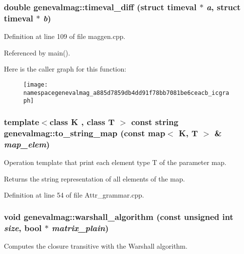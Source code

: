 \hypertarget{namespacegenevalmag_a885d7859db4dd91f78bb7081be6ceacb}{
\subsubsection[{timeval\_\-diff}]{\setlength{\rightskip}{0pt plus 5cm}double genevalmag::timeval\_\-diff (struct timeval $\ast$ {\em a}, \/  struct timeval $\ast$ {\em b})}}
\label{namespacegenevalmag_a885d7859db4dd91f78bb7081be6ceacb}


Definition at line 109 of file maggen.cpp.



Referenced by main().



Here is the caller graph for this function:\nopagebreak
\begin{figure}[H]
\begin{center}
\leavevmode
\texttt{[image: namespacegenevalmag\_a885d7859db4dd91f78bb7081be6ceacb\_icgraph]}
\end{center}
\end{figure}


\hypertarget{namespacegenevalmag_abdfa348edf2ec215b8dce63ebeab02e9}{
\subsubsection[{to\_\-string\_\-map}]{\setlength{\rightskip}{0pt plus 5cm}template$<$class K , class T $>$ const string genevalmag::to\_\-string\_\-map (const map$<$ K, T $>$ \& {\em map\_\-elem})}}
\label{namespacegenevalmag_abdfa348edf2ec215b8dce63ebeab02e9}
Operation template that print each element type T of the parameter map.

Returns the string representation of all elements of the map. 

Definition at line 54 of file Attr\_\-grammar.cpp.

\hypertarget{namespacegenevalmag_a311f0385029ff37574bbf0189064f310}{
\subsubsection[{warshall\_\-algorithm}]{\setlength{\rightskip}{0pt plus 5cm}void genevalmag::warshall\_\-algorithm (const unsigned int {\em size}, \/  bool $\ast$ {\em matrix\_\-plain})}}
\label{namespacegenevalmag_a311f0385029ff37574bbf0189064f310}
Computes the closure transitive with the Warshall algorithm. 

